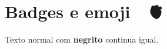 \section{Badges e emoji 🌊 🫀}\label{badges-e-emoji}

 
\href{https://github.com/topics/civic-tech}{}
 

\href{https://marola.dev}{}

Texto normal com \textbf{negrito} continua igual.
